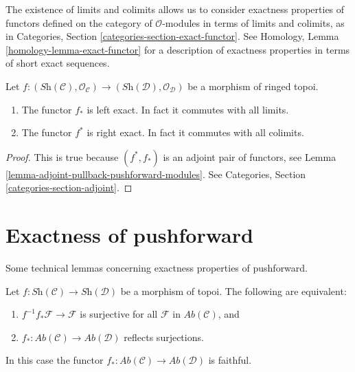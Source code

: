 \noindent
The existence of limits and colimits allows us to consider exactness
properties of functors defined on the category of $\mathcal{O}$-modules
in terms of limits and colimits, as in
Categories, Section \ref{categories-section-exact-functor}.
See Homology, Lemma \ref{homology-lemma-exact-functor} for a description of
exactness properties in terms of short exact sequences.

\begin{lemma}
\label{lemma-exactness-pushforward-pullback}
Let $f : (\textit{Sh}(\mathcal{C}), \mathcal{O}_{\mathcal{C}})
\to (\textit{Sh}(\mathcal{D}), \mathcal{O}_{\mathcal{D}})$
be a morphism of ringed topoi.
\begin{enumerate}
\item The functor $f_*$ is left exact. In fact it commutes with
all limits.
\item The functor $f^*$ is right exact. In fact it commutes
with all colimits.
\end{enumerate}
\end{lemma}

\begin{proof}
This is true because $(f^*, f_*)$ is an adjoint pair
of functors, see
Lemma \ref{lemma-adjoint-pullback-pushforward-modules}.
See Categories, Section \ref{categories-section-adjoint}.
\end{proof}





\section{Exactness of pushforward}
\label{section-pushforward}

\noindent
Some technical lemmas concerning exactness properties of pushforward.

\begin{lemma}
\label{lemma-reflect-surjections}
Let $f : \textit{Sh}(\mathcal{C}) \to \textit{Sh}(\mathcal{D})$ be
a morphism of topoi. The following are equivalent:
\begin{enumerate}
\item $f^{-1}f_*\mathcal{F} \to \mathcal{F}$ is surjective for
all $\mathcal{F}$ in $\textit{Ab}(\mathcal{C})$, and
\item $f_* : \textit{Ab}(\mathcal{C}) \to \textit{Ab}(\mathcal{D})$
reflects surjections.
\end{enumerate}
In this case the functor
$f_* : \textit{Ab}(\mathcal{C}) \to \textit{Ab}(\mathcal{D})$
is faithful.
\end{lemma}

